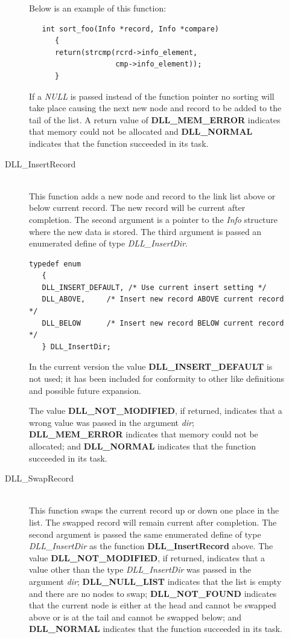 \documentclass[10pt,letterpaper,titlepage]{article}
\begin{document}
\begin{description}
\begin{description}
 Below is an example of this function:

\begin{verbatim}
   int sort_foo(Info *record, Info *compare)
      {
      return(strcmp(rcrd->info_element,
                    cmp->info_element));
      }

\end{verbatim}
 
 If a \emph{NULL} is passed instead of the function pointer no sorting will take place causing the next new node and record to be added to the tail of the list.  A return value of \textbf{DLL\_MEM\_ERROR} indicates that memory could not be allocated and \textbf{DLL\_NORMAL} indicates that the function succeeded in its task.

 \item[DLL\_InsertRecord]\quad\\
 This function adds a new node and record to the link list above or below current record.  The new record will be current after completion.  The second argument is a pointer to the \emph{Info} structure where the new data is stored.  The third argument is passed an enumerated define of type \emph{DLL\_InsertDir}.  

 \small
 \begin{verbatim}
typedef enum
   {
   DLL_INSERT_DEFAULT, /* Use current insert setting */
   DLL_ABOVE,     /* Insert new record ABOVE current record */
   DLL_BELOW      /* Insert new record BELOW current record */ 
   } DLL_InsertDir;
\end{verbatim}
 \normalsize

 In the current version the value \textbf{DLL\_INSERT\_DEFAULT} is not used; it has been included for conformity to other like definitions and possible future expansion.
\vspace{8pt}

\noindent
 The value \textbf{DLL\_NOT\_MODIFIED}, if returned, indicates that a wrong value was passed in the argument \emph{dir}; \textbf{DLL\_MEM\_ERROR} indicates that memory could not be allocated; and \textbf{DLL\_NORMAL} indicates that the function succeeded in its task.

 \item[DLL\_SwapRecord]\quad\\
 This function swaps the current record up or down one place in the list.  The swapped record will remain current after completion.  The second argument is passed the same enumerated define of type \emph{DLL\_InsertDir} as the function \textbf{DLL\_InsertRecord} above.  The value \textbf{DLL\_NOT\_MODIFIED}, if returned, indicates that a value other than the type \emph{DLL\_InsertDir} was passed in the argument \emph{dir}; \textbf{DLL\_NULL\_LIST} indicates that the list is empty and there are no nodes to swap; \textbf{DLL\_NOT\_FOUND} indicates that the current node is either at the head and cannot be swapped above or is at the tail and cannot be swapped below; and \textbf{DLL\_NORMAL} indicates that the function succeeded in its task.


\end{description}
\end{description}
\end{document}
